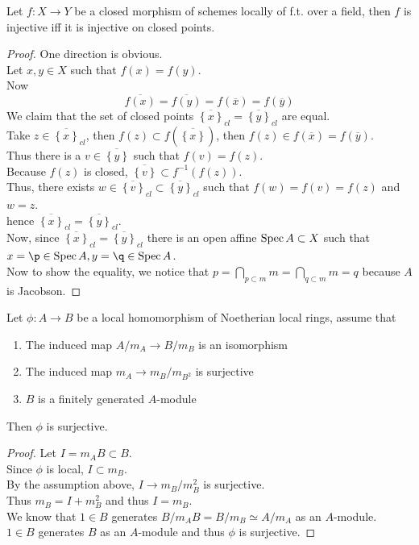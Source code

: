 \documentclass[../main.tex]{subfiles}
\begin{document}
\begin{lemma}
Let $f:X\to Y$ be a closed morphism of schemes locally of f.t. over a field, then $f$ is injective iff it is injective on closed points.
\end{lemma}
\begin{proof}
One direction is obvious.\\
Let $x,y \in X$ such that $f( x) = f( y) $.\\
Now
\[ 
\overline{f( x) }= \overline{f( y) }= f(  \overline{x}) = f( \overline{y}) 
\]
We claim that the set of closed points $ \overline{ \left\{ x \right\} }_{cl} = \overline{\left\{ y \right\} }_{cl} $ are equal.\\
Take $z\in \overline{\left\{ x \right\} }_{cl} $, then $f( z) \subset f(  \overline{ \left\{ x \right\} }) $, then $f( z) \in f(  \overline{x}) = f( \overline{y}) $.\\
Thus there is a $v\in \overline{\left\{ y \right\}} $ such that $f( v) = f( z) $.\\
Because $f( z) $ is closed, $ \overline{ \left\{ v \right\} } \subset f^{-1}( f( z) ) $.\\
Thus, there exists $w\in \overline{ \left\{ v \right\} }_{cl} \subset  \overline{ \left\{ y \right\} }_{cl} $ such that $f( w) = f( v) = f( z) $ and $w= z$.\\
hence $ \overline{ \left\{ x \right\} }_{cl} = \overline{ \left\{ y \right\} }_{cl} $.\\
Now, since $ \overline{ \left\{ x \right\} }_{cl} = \overline{ \left\{ y \right\} }_{cl} $ there is an open affine $\operatorname{Spec} A \subset X$ such that $ x= \p \in \spec A, y = \q \in \spec A$.\\
Now to show the equality, we notice that $ p=\bigcap_{p \subset m} m= \bigcap_{q \subset m} m= q$ because $A$ is Jacobson.
\end{proof}
\begin{lemma}
Let $\phi:A\to B$ be a local homomorphism of Noetherian local rings, assume that 
\begin{enumerate}
\item The induced map $ A /m_A \to B /m_B$ is an isomorphism
\item The induced map $m_A \to m_B /m_{B^{2}} $ is surjective
\item $B$ is a finitely generated $A$-module
\end{enumerate}
Then $\phi$  is surjective.
\end{lemma}
\begin{proof}
Let $I = m_A B \subset B$.\\
Since $\phi$ is local, $I \subset m_B$.\\
By the assumption above, $I \to m_B /m_B^{2}$ is surjective.\\
Thus $m_B = I + m_B^{2}$ and thus $I= m_B$.\\
We know that $1\in B$ generates $B /m_A B = B/m_B \simeq A /m_A$ as an $A$-module.\\
$1\in B$ generates $B$ as an $A$-module and thus $\phi$  is surjective.
\end{proof}
\end{document}
